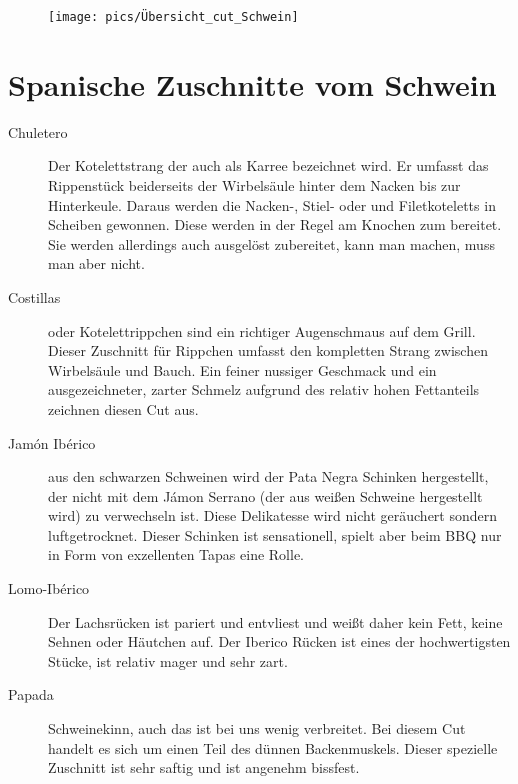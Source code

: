 \newpage
\begin{figure}[htbp]
	\centering
	\begin{minipage}{1\textwidth}
		\centering
		\texttt{[image: pics/Übersicht\_cut\_Schwein]}
		\label{fig:Übersicht1}
	\end{minipage}
\end{figure}
\newpage

\section{Spanische Zuschnitte vom Schwein}

\begin{description}

	\item [Chuletero] Der Kotelettstrang der auch als Karree bezeichnet wird. Er umfasst das Rippenstück
	beiderseits der Wirbelsäule hinter dem Nacken bis zur Hinterkeule. Daraus werden die Nacken-, Stiel- oder 
	und Filetkoteletts in Scheiben gewonnen. Diese werden in der Regel am Knochen zum bereitet. Sie werden 
	allerdings auch ausgelöst zubereitet, kann man machen, muss man aber nicht. 
	
	\item [Costillas] oder Kotelettrippchen sind ein richtiger Augenschmaus auf dem Grill. Dieser Zuschnitt für 
	Rippchen umfasst den kompletten Strang zwischen Wirbelsäule und Bauch. Ein feiner nussiger Geschmack 
	und ein ausgezeichneter, zarter Schmelz aufgrund des relativ hohen Fettanteils zeichnen diesen Cut aus.
	
	\item [Jamón Ibérico] aus den schwarzen Schweinen wird der Pata Negra Schinken hergestellt, der nicht mit 
	dem Jámon Serrano (der aus weißen Schweine hergestellt wird) zu verwechseln ist. Diese Delikatesse wird 
	nicht geräuchert sondern luftgetrocknet. Dieser Schinken ist sensationell, spielt aber beim BBQ nur in Form 
	von exzellenten Tapas eine Rolle. 
	
	\item [Lomo-Ibérico] Der Lachsrücken ist pariert und entvliest und weißt daher kein Fett, keine Sehnen oder 
	Häutchen auf. Der Iberico Rücken ist eines der hochwertigsten Stücke, ist relativ mager und sehr zart.
	
	\item [Papada] Schweinekinn, auch das ist bei uns wenig verbreitet. Bei diesem Cut handelt es sich 
	um einen Teil des dünnen Backenmuskels. Dieser spezielle Zuschnitt ist sehr saftig und ist angenehm bissfest.
	

\end{description}

